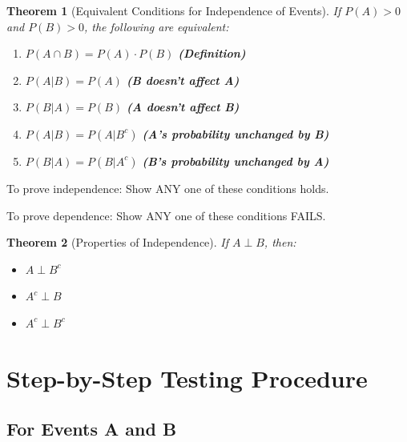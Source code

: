 \documentclass[11pt]{article}
\newtheorem{theorem}{Theorem}
\begin{document}
\begin{theorem}[Equivalent Conditions for Independence of Events]
If $P(A) > 0$ and $P(B) > 0$, the following are equivalent:
\begin{enumerate}
    \item $P(A \cap B) = P(A) \cdot P(B)$ \quad \textbf{(Definition)}

    \item $P(A | B) = P(A)$ \quad \textbf{(B doesn't affect A)}

    \item $P(B | A) = P(B)$ \quad \textbf{(A doesn't affect B)}

    \item $P(A | B) = P(A | B^c)$ \quad \textbf{(A's probability unchanged by B)}

    \item $P(B | A) = P(B | A^c)$ \quad \textbf{(B's probability unchanged by A)}
\end{enumerate}
\end{theorem}

\begin{tcolorbox}[colback=blue!5!white,colframe=blue!75!black,title=Proof Strategy]
To prove independence: Show ANY one of these conditions holds.

To prove dependence: Show ANY one of these conditions FAILS.
\end{tcolorbox}

\begin{theorem}[Properties of Independence]
If $A \perp B$, then:
\begin{itemize}
    \item $A \perp B^c$
    \item $A^c \perp B$
    \item $A^c \perp B^c$
\end{itemize}
\end{theorem}

\section{Step-by-Step Testing Procedure}

\subsection{For Events A and B}
\end{document}
